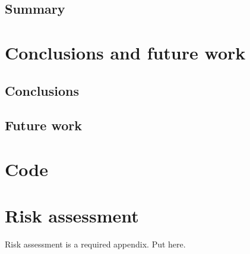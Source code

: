     \subsection{Summary}
  \section{Conclusions and future work} %
    \subsection{Conclusions}
      \subsection{Future work}
    \printbibliography
  \begin{uomappendix} 
      \section{Code}
      \section{Risk assessment}
      Risk assessment is a required appendix. Put here.
  \end{uomappendix}
  
  